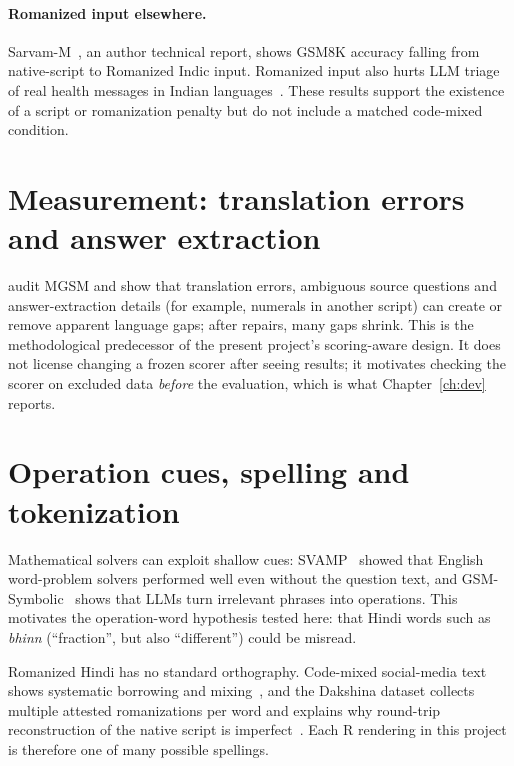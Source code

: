 \documentclass[12pt,a4paper,oneside]{report}
\renewcommand{\_}{\oldunderscore\allowbreak}
\begin{document}
\paragraph{Romanized input elsewhere.} Sarvam-M~\citep{sarvam-2025-sarvamm}, an author technical report, shows GSM8K accuracy falling from native-script to Romanized Indic input. Romanized input also hurts LLM triage of real health messages in Indian languages~\citep{khullar-etal-2026-script}. These results support the existence of a script or romanization penalty but do not include a matched code-mixed condition.

\section{Measurement: translation errors and answer extraction}

\citet{peter-etal-2026-mind} audit MGSM and show that translation errors, ambiguous source questions and answer-extraction details (for example, numerals in another script) can create or remove apparent language gaps; after repairs, many gaps shrink. This is the methodological predecessor of the present project's scoring-aware design. It does not license changing a frozen scorer after seeing results; it motivates checking the scorer on excluded data \emph{before} the evaluation, which is what Chapter~\ref{ch:dev} reports.

\section{Operation cues, spelling and tokenization}

Mathematical solvers can exploit shallow cues: SVAMP~\citep{patel-etal-2021-nlp} showed that English word-problem solvers performed well even without the question text, and GSM-Symbolic~\citep{mirzadeh-etal-2025-gsmsymbolic} shows that LLMs turn irrelevant phrases into operations. This motivates the operation-word hypothesis tested here: that Hindi words such as \emph{bhinn} (``fraction'', but also ``different'') could be misread.

Romanized Hindi has no standard orthography. Code-mixed social-media text shows systematic borrowing and mixing~\citep{bali-etal-2014-borrowing}, and the Dakshina dataset collects multiple attested romanizations per word and explains why round-trip reconstruction of the native script is imperfect~\citep{roark-etal-2020-processing}. Each R rendering in this project is therefore one of many possible spellings.
\end{document}
